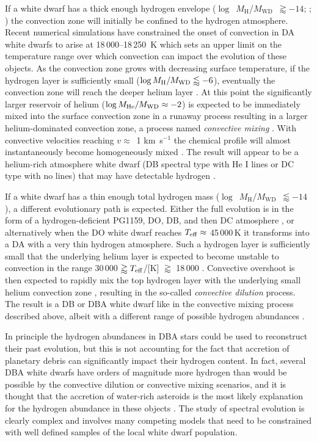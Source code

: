 \documentclass[a4paper,fleqn,usenatbib]{mnras}
\newcommand{\Mwd}{$M_{\mathrm{WD}}$}
\newcommand{\MH}{$M_{\mathrm{H}}$}
\begin{document}
If a white dwarf has a thick enough hydrogen envelope ($\log$~\MH/\Mwd\ $\gtrapprox -14$; \citealt{rolland18}; \citealt{genest-Beaulieu19}) the convection zone will initially be confined to the hydrogen atmosphere. Recent numerical simulations have constrained the onset of convection in DA white dwarfs to arise at 18\,000--18\,250~K \citep{cunningham19} which sets an upper limit on the temperature range over which convection can impact the evolution of these objects. As the convection zone grows with decreasing surface temperature, if the hydrogen layer is sufficiently small ($\log M_{\mathrm{H}}/M_{\rm WD} \lessapprox -6$), eventually the convection zone will reach the deeper helium layer \citep{fontaine01}. At this point the significantly larger reservoir of helium ($\log M_{\mathrm{He}}/M_{\rm WD} \approx -2$) is expected to be immediately mixed into the surface convection zone in a runaway process resulting in a larger helium-dominated convection zone, a process named {\it convective mixing} \citep{strittmatter71,shipman72,baglin73,koester76}. With convective velocities reaching $v\approx$~1 km~s$^{-1}$ the chemical profile will almost instantaneously become homogeneously mixed \citep{elena1,cunningham19}. The result will appear to be a helium-rich atmosphere white dwarf (DB spectral type with He {\small I} lines or DC type with no lines) that may have detectable hydrogen \citep[DBA or DA spectral types;][]{rolland18}.

If a white dwarf has a thin enough total hydrogen mass ($\log$~\MH/\Mwd\ $\lessapprox -14$), a different evolutionary path is expected. Either the full evolution is in the form of a hydrogen-deficient PG1159, DO, DB, and then DC atmosphere \citep{genest-Beaulieu19}, or alternatively when the DO white dwarf reaches $T_{\rm eff} \approx$ 45\,000\,K it transforms into a DA with a very thin hydrogen atmosphere. Such a hydrogen layer is sufficiently small that the underlying helium layer is expected to become unstable to convection in the range 30\,000 $\gtrapprox T_{\rm eff}$/[K] $\gtrapprox$ 18\,000 \citep{macDonald91,rolland18,genest-Beaulieu19}. Convective overshoot is then expected to rapidly mix the top hydrogen layer with the underlying small helium convection zone \citep{cunningham19,elena2}, resulting in the so-called {\it convective dilution} process. The result is a DB or DBA white dwarf like in the convective mixing process described above, albeit with a different range of possible hydrogen abundances \citep{genest-Beaulieu19}.

In principle the hydrogen abundances in DBA stars could be used to reconstruct their past evolution, but this is not accounting for the fact that accretion of planetary debris can significantly impact their hydrogen content. In fact, several DBA white dwarfs have orders of magnitude more hydrogen than would be possible by the convective dilution or convective mixing scenarios, and it is thought that the accretion of water-rich asteroids is the most likely explanation for the hydrogen abundance in these objects \citep{farihi11,raddi15,ngf17}. The study of spectral evolution is clearly complex and involves many competing models that need to be constrained with well defined samples of the local white dwarf population.
\end{document}
